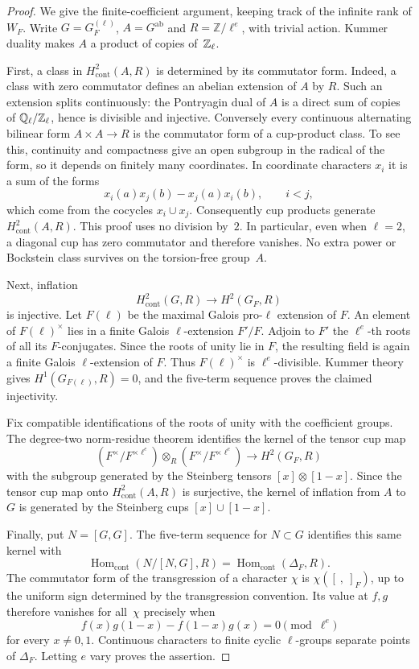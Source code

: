 \begin{proof}
We give the finite-coefficient argument, keeping track of the
infinite rank of $W_F$.  Write $G=G_F^{(\ell)}$, $A=G^{\mathrm{ab}}$
and $R=\mathbb Z/\ell^e$, with trivial action.  Kummer duality makes
$A$ a product of copies of~$\mathbb Z_\ell$.

First, a class in $H^2_{\mathrm{cont}}(A,R)$ is determined by its
commutator form.  Indeed, a class with zero commutator defines
an abelian extension of $A$ by $R$.  Such an extension splits
continuously: the Pontryagin dual of $A$ is a direct sum of copies of
$\mathbb Q_\ell/\mathbb Z_\ell$, hence is divisible and injective.  Conversely every
continuous alternating bilinear form $A\times A\to R$ is the
commutator form of a cup-product class.  To see this, continuity and
compactness give an open subgroup in the radical of the form, so it
depends on finitely many coordinates.  In coordinate characters $x_i$
it is a sum of the forms
\[
 x_i(a)x_j(b)-x_j(a)x_i(b),\qquad i<j,
\]
which come from the cocycles $x_i\cup x_j$.
Consequently cup products generate $H^2_{\mathrm{cont}}(A,R)$.
This proof uses no division by~$2$.  In particular, even when $\ell=2$,
a diagonal cup has zero commutator and therefore vanishes.  No extra
power or Bockstein class survives on the torsion-free group~$A$.

Next, inflation
\[
 H^2_{\mathrm{cont}}(G,R)\longrightarrow H^2(G_F,R)
\]
is injective.  Let $F(\ell)$ be the maximal Galois pro-$\ell$ extension
of $F$.  An element of $F(\ell)^\times$ lies in a finite Galois
$\ell$-extension $F'/F$.  Adjoin to $F'$ the $\ell^e$-th roots of all
its $F$-conjugates.  Since the roots of unity lie in $F$, the resulting
field is again a finite Galois $\ell$-extension of $F$.  Thus
$F(\ell)^\times$ is $\ell^e$-divisible.  Kummer theory gives
$H^1(G_{F(\ell)},R)=0$, and the five-term sequence proves the claimed
injectivity.

Fix compatible identifications of the roots of unity with the
coefficient groups.  The degree-two norm-residue theorem
\cite{MS1982} identifies the kernel of the tensor cup map
\[
 (F^\times/F^{\times\ell^e})\otimes_R
 (F^\times/F^{\times\ell^e})\longrightarrow H^2(G_F,R)
\]
with the subgroup generated by the Steinberg tensors
$[x]\otimes[1-x]$.  Since the tensor cup map onto
$H^2_{\mathrm{cont}}(A,R)$ is surjective, the kernel of inflation from
$A$ to $G$ is generated by the Steinberg cups $[x]\cup[1-x]$.

Finally, put $N=[G,G]$.  The five-term sequence for $N\subset G$
identifies this same kernel with
\[
 \operatorname{Hom}_{\mathrm{cont}}(N/[N,G],R)
 =\operatorname{Hom}_{\mathrm{cont}}(\Delta_F,R).
\]
The commutator form of the transgression of a character $\chi$ is
$\chi([\ ,\ ]_F)$, up to the uniform sign determined by the
transgression convention.  Its value at $f,g$ therefore vanishes for
all~$\chi$ precisely when
\[
 f(x)g(1-x)-f(1-x)g(x)=0\pmod{\ell^e}
\]
for every $x\ne0,1$.  Continuous characters to finite cyclic
$\ell$-groups separate points of $\Delta_F$.  Letting $e$ vary proves
the assertion.
\end{proof}

